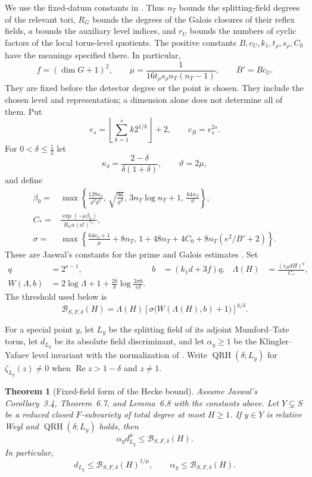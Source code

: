 \documentclass[11pt]{article}
\newtheorem{theorem}{Theorem}[section]
\theoremstyle{definition}
\theoremstyle{remark}
\begin{document}
We use the fixed-datum constants in \cite[Table~1 and \S2.3]{Jaswal}.
Thus $n_T$ bounds the splitting-field degrees of the relevant tori,
$R_G$ bounds the degrees of the Galois closures of their reflex
fields, $a$ bounds the auxiliary level indices, and $r_U$ bounds the
numbers of cyclic factors of the local torus-level quotients.
The positive constants $B,c_U,k_1,t_\rho,s_\rho,C_0$ have the
meanings specified there.  In particular,
\[
 f=(\dim G+1)^2,\qquad
 \mu=\frac{1}{16t_\rho s_\rho n_T(n_T-1)},\qquad B'=Bc_U.
\]
They are fixed before the detector degree or the point is chosen.
They include the chosen level and representation; a dimension alone
does not determine all of them.  Put
\[
 e_s=\left\lfloor\sum_{k=1}^{s}k2^{1/k}\right\rfloor+2,
 \qquad c_B=e_s^{2s}.
\]
For $0<\delta\leq\tfrac12$ let
\[
 \kappa_\delta=\frac{2-\delta}{\delta(1+\delta)},\qquad
 \vartheta=2\mu,
\]
and define
\begin{align*}
 \beta_0={}&\max\left\{
 \frac{128\kappa_\delta}{\vartheta^2\delta^2},\,
 \sqrt{\frac{96}{\vartheta^3}},\,
 3n_T\log n_T+1,\,\frac{64n_T}{\vartheta}\right\},\\
 C_*={}&\frac{\exp(-\mu\beta_0)}{R_Ga(a!)^{r_U}},\\
 \sigma={}&\max\left\{
 \frac{64\kappa_\delta+1}{\mu}+8n_T,\,
 1+48n_T+4C_0+8n_T(e^2/B'+2)\right\}.
\end{align*}
These are Jaswal's constants for the prime and Galois estimates
\cite[\S3.2, Corollary~3.4, and Lemma~6.8]{Jaswal}.
Set
\begin{align*}
 q&=2^{s-1},& b&=(k_1d+3f)q,&
 \Lambda(H)&=\frac{(c_BdH)^q}{C_*},\\
 W(\Lambda,b)&=2\log\Lambda+1+
       \frac{2b}{\delta}\log\frac{2\sigma b}{e\delta}.
\end{align*}
The threshold used below is
\begin{equation}\label{eq:fixed-field-threshold}
 \mathcal B_{S,F,\delta}(H)
 =\Lambda(H)\left[\sigma\bigl(W(\Lambda(H),b)+1\bigr)\right]^{b/\delta}.
\end{equation}

For a special point $y$, let $L_y$ be the splitting field of its
adjoint Mumford--Tate torus, let $d_{L_y}$ be its absolute field
discriminant, and let $\alpha_y\geq1$ be the Klingler--Yafaev level
invariant with the normalization of \cite[Definition~2.2]{Jaswal}.
Write $\operatorname{QRH}(\delta;L_y)$ for
$\zeta_{L_y}(z)\ne0$ when $\operatorname{Re}z>1-\delta$ and $z\ne1$.

\begin{theorem}[Fixed-field form of the Hecke bound]
\label{thm:fixed-field-bound}
Assume Jaswal's Corollary~3.4, Theorem~6.7, and Lemma~6.8 with the
constants above.  Let $Y\subsetneq S$ be a reduced closed
$F$-subvariety of total degree at most $H\geq1$.  If $y\in Y$ is
relative Weyl and $\operatorname{QRH}(\delta;L_y)$ holds, then
\[
 \alpha_y d_{L_y}^{\mu}\leq\mathcal B_{S,F,\delta}(H).
\]
In particular,
\[
 d_{L_y}\leq\mathcal B_{S,F,\delta}(H)^{1/\mu},
 \qquad \alpha_y\leq\mathcal B_{S,F,\delta}(H).
\]
\end{theorem}
\end{document}
